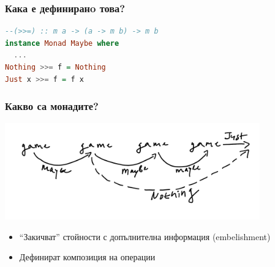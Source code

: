 \documentclass{beamer}
\begin{document}
\begin{frame}[fragile]
  \frametitle{Кака е дефиниранo това?}

\begin{lstlisting}[basicstyle=\small,language=Haskell]
--(>>=) :: m a -> (a -> m b) -> m b
instance Monad Maybe where
  ...
Nothing >>= f = Nothing
Just x >>= f = f x
\end{lstlisting}

\end{frame}


\begin{frame}[fragile]
  \frametitle{Какво са монадите?}

  \includegraphics[width=110mm]{images/composition}

\begin{itemize}
  \item ``Закичват'' стойности с допълнителна информация (embelishment)
  \item Дефинират композиция на операции
\end{itemize}

\end{frame}
 

\end{document}
